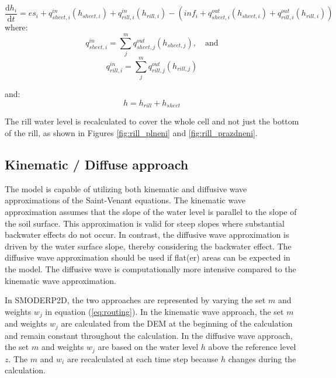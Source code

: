             \begin{equation}
                \frac{\mathrm{d}h_i}{\mathrm{d}t} = es_i + q^{in}_{sheet,i}(h_{sheet,i})
                +q^{in}_{rill,i}(h_{rill,i}) - (inf_i + q^{out}_{sheet,i}(h_{sheet,i}) +
                q^{out}_{rill,i}(h_{rill,i}))
            \end{equation}
            where:
            \begin{equation}
                q^{in}_{sheet,i} = \sum_j^m q^{out}_{sheet, j}(h_{sheet,j}),\quad \mathrm{and}
            \end{equation}
            \begin{equation}
                q^{in}_{rill,i} = \sum_j^m q^{out}_{rill, j}(h_{rill,j})
            \end{equation}

            and:
            \begin{equation}
               h = h_{rill} + h_{sheet}  
            \end{equation}

            The rill water level is recalculated to cover the whole cell and not just the
            bottom of the rill, as shown in Figures \ref{fig:rill_plneni} and
            \ref{fig:rill_prazdneni}.
 

    \subsection{Kinematic / Diffuse approach}
        The model is capable of utilizing both kinematic and diffusive wave
        approximations of the Saint-Venant equations. The kinematic wave
        approximation assumes that the slope of the water level is parallel to
        the slope of the soil surface. This approximation is valid for steep
        slopes where substantial backwater effects do not occur. In contrast,
        the diffusive wave approximation is driven by the water surface slope,
        thereby considering the backwater effect. The diffusive wave
        approximation should be used if flat(er) areas can be expected in the
        model. The diffusive wave is computationally more intensive compared to
        the kinematic wave approximation.

        In SMODERP2D, the two approaches are represented by varying the set $m$
        and weights $w_j$ in equation (\ref{eq:routing}). In the kinematic wave
        approach, the set $m$ and weights $w_j$ are calculated from the DEM at
        the beginning of the calculation and remain constant throughout the
        calculation. In the diffusive wave approach, the set $m$ and weights
        $w_j$ are based on the water level $h$ above the reference level $z$.
        The $m$ and $w_i$ are recalculated at each time step because $h$
        changes during the calculation.

